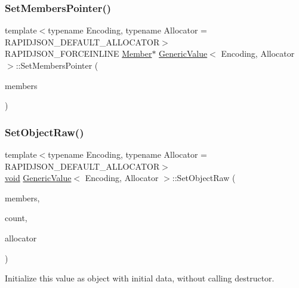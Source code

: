\subsubsection{\texorpdfstring{Set\+Members\+Pointer()}{SetMembersPointer()}}
{\footnotesize\ttfamily template$<$typename Encoding, typename Allocator = R\+A\+P\+I\+D\+J\+S\+O\+N\+\_\+\+D\+E\+F\+A\+U\+L\+T\+\_\+\+A\+L\+L\+O\+C\+A\+T\+OR$>$ \\
R\+A\+P\+I\+D\+J\+S\+O\+N\+\_\+\+F\+O\+R\+C\+E\+I\+N\+L\+I\+NE \hyperlink{classGenericValue_a7ccf27c44058b4c11c3efc6473afb886}{Member}$\ast$ \hyperlink{classGenericValue}{Generic\+Value}$<$ Encoding, Allocator $>$\+::Set\+Members\+Pointer (\begin{DoxyParamCaption}\item[{\hyperlink{classGenericValue_a7ccf27c44058b4c11c3efc6473afb886}{Member} $\ast$}]{members }\end{DoxyParamCaption})\hspace{0.3cm}{\ttfamily [inline]}}

\mbox{\label{classGenericValue_a26c8ec7d68858df1038506df7fcff22d}} 
\subsubsection{\texorpdfstring{Set\+Object\+Raw()}{SetObjectRaw()}}
{\footnotesize\ttfamily template$<$typename Encoding, typename Allocator = R\+A\+P\+I\+D\+J\+S\+O\+N\+\_\+\+D\+E\+F\+A\+U\+L\+T\+\_\+\+A\+L\+L\+O\+C\+A\+T\+OR$>$ \\
\hyperlink{imgui__impl__opengl3__loader_8h_ac668e7cffd9e2e9cfee428b9b2f34fa7}{void} \hyperlink{classGenericValue}{Generic\+Value}$<$ Encoding, Allocator $>$\+::Set\+Object\+Raw (\begin{DoxyParamCaption}\item[{\hyperlink{classGenericValue_a7ccf27c44058b4c11c3efc6473afb886}{Member} $\ast$}]{members,  }\item[{\hyperlink{rapidjson_8h_a5ed6e6e67250fadbd041127e6386dcb5}{Size\+Type}}]{count,  }\item[{Allocator \&}]{allocator }\end{DoxyParamCaption})\hspace{0.3cm}{\ttfamily [inline]}}



Initialize this value as object with initial data, without calling destructor. 

